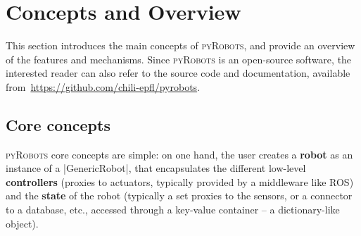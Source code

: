 \documentclass[a4paper, 10pt, conference]{ieeeconf}      %
\newcommand{\pyRobots}{\textsc{pyRobots}}
\begin{document}
%
%
%
%
%
\section{Concepts and Overview}

This section introduces the main concepts of \pyRobots{},
and provide an overview of the features and mechanisms. Since \pyRobots{} is an
open-source software, the interested reader can also refer to the source code
and documentation, available from~\url{https://github.com/chili-epfl/pyrobots}.

\subsection{Core concepts}

\pyRobots{} core concepts are simple: on one hand, the user creates a
\textbf{robot} as an instance of a \python|GenericRobot|, that encapsulates the
different low-level \textbf{controllers} (proxies to actuators, typically
provided by a middleware like ROS) and the \textbf{state} of the robot
(typically a set proxies to the sensors, or a connector to a database, etc.,
accessed through a key-value container -- a dictionary-like object).
\end{document}
